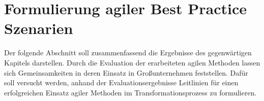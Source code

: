 \section{Formulierung agiler Best Practice Szenarien}



Der folgende Abschnitt soll zusammenfassend die Ergebnisse des gegenwärtigen Kapitels darstellen. Durch die Evaluation der erarbeiteten agilen Methoden lassen sich Gemeinsamkeiten in deren Einsatz in Großunternehmen feststellen. Dafür soll versucht werden, anhand der Evaluationsergebnisse Leitlinien für einen erfolgreichen Einsatz agiler Methoden im Transformationsprozess zu formulieren.

\todots


